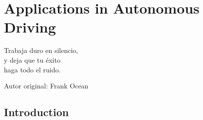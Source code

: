 % 
% 
% 
% 
% 
% 
% 

\chapter{Applications in Autonomous Driving}
\label{cha:applications_in_autonomous_driving}

\begin{FraseCelebre}
	\begin{Frase}
		Trabaja duro en silencio, \\
		y deja que tu éxito \\ 
		haga todo el ruido.
	\end{Frase}
	\begin{Fuente}
		Autor original: Frank Ocean
	\end{Fuente}
\end{FraseCelebre}

\section{Introduction}
\label{sec:8_introduction}


